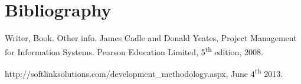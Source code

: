 \section*{Bibliography}

\begin{thebibliography}{9}
Writer,
Book. Other info.
James Cadle and Donald Yeates,
Project Management
for Information Systems. Pearson Education Limited, 5\textsuperscript{th} edition, 2008.

http://softlinksolutions.com/development\_methodology.aspx, June 4\textsuperscript{th} 2013.
\end{thebibliography}
\newpage
